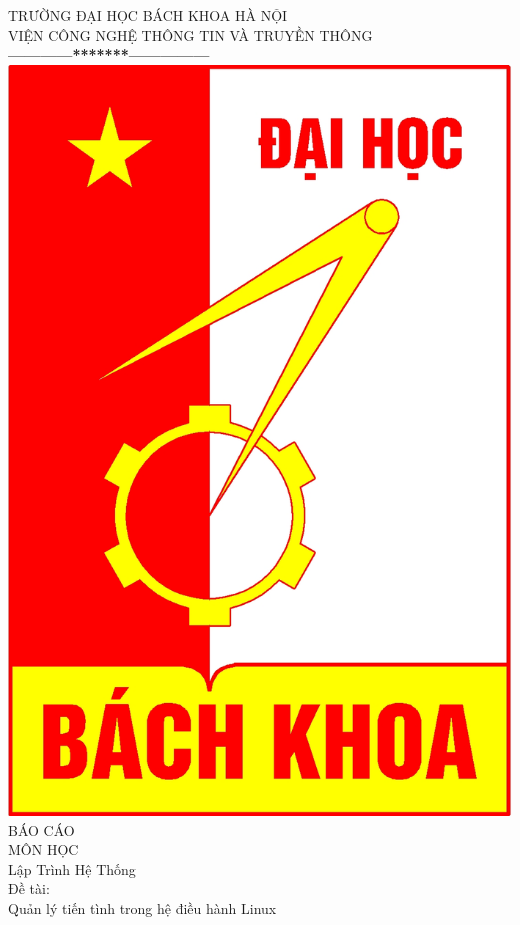 \documentclass[a4paper,10pt]{report}
\begin{document}
\thispagestyle{empty}
\thisfancypage{
\setlength{\fboxrule}{1pt}
\doublebox}{}
\begin{center}
{\fontsize{16}{19}\selectfont TRƯỜNG ĐẠI HỌC BÁCH KHOA HÀ NỘI\\
VIỆN CÔNG NGHỆ THÔNG TIN VÀ TRUYỀN THÔNG}\\
\textbf{------------*******---------------}\\[1cm]
\includegraphics[scale=0.13]{hust.jpg}\\[1.3cm]

{\fontsize{32}{43}\selectfont BÁO CÁO}\\[0.1cm]
{\fontsize{38}{45}\selectfont MÔN HỌC}\\[0.2cm]
{\fontsize{19}{20}\selectfont Lập Trình Hệ Thống}\\[1cm]
{\fontsize{17}{24}\selectfont Đề tài:}\\[1cm]
{\fontsize{17}{24}\selectfont Quản lý tiến tình trong hệ điều hành Linux}\\[2cm]
\end{center}
\end{document}
